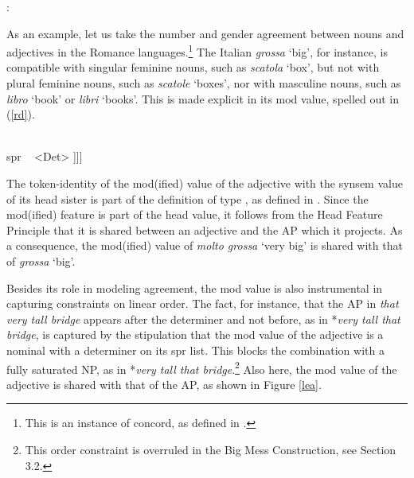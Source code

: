\documentclass[output=paper]{langsci/langscibook}
\begin{document}
\begin{exe} 
\ex   {}: \begin{avm} 
                          \end{avm} 
\end{exe} 

\noindent
As an example, let us take the number and gender agreement 
between nouns and adjectives in the Romance languages.\footnote{This is an 
instance of concord, as defined in .}  
The Italian \emph{grossa} `big', for instance, 
is compatible with singular feminine nouns, such as \emph{scatola} `box', 
but not with plural feminine nouns, such as \emph{scatole} `boxes', nor
with masculine nouns, such as \emph{libro} `book' or \emph{libri} `books'. 
This is made explicit in its {\sc mod} value, spelled out in (\ref{rd}). 

\begin{exe} 
\ex\label{rd}
\begin{avm}
[\type{category}                              \\
 head [\type{adjective}                         \\
       mod|loc|cat [head [\type{noun}          \\
                          number ~ \type{sing} \\
                          gender ~ \type{fem}] \\
                    spr ~ <Det> ]]]
\end{avm}
\end{exe}

\noindent
The token-identity of the {\sc mod(ified)} value of the adjective
with the {\sc synsem} value of its head sister is part of the 
definition of type , as defined in . 
Since the {\sc mod(ified)} feature is part of the {\sc head} value, it follows from the 
Head Feature Principle that it is shared between an adjective 
and the AP which it projects. As a consequence, the {\sc mod(ified)} value of 
\emph{molto grossa} `very big' is shared with that of \emph{grossa} `big'. 
 
Besides its role in modeling agreement, the {\sc mod} value is also instrumental 
in capturing constraints on linear order.  
The fact, for instance, that the AP in \emph{that very tall bridge} appears 
after the determiner and not before, as in *\emph{very tall that bridge},
is captured by the stipulation that the {\sc mod} value of the adjective 
is a nominal with a determiner on its {\sc spr} list. This blocks the 
combination with a fully saturated NP, as in 
*\emph{very tall that bridge}.\footnote{This order constraint is overruled in 
the Big Mess Construction, see Section 3.2.} Also here, the {\sc mod} value of 
the adjective is shared with that of the AP, as shown in Figure \ref{lea}. 
\end{document}
